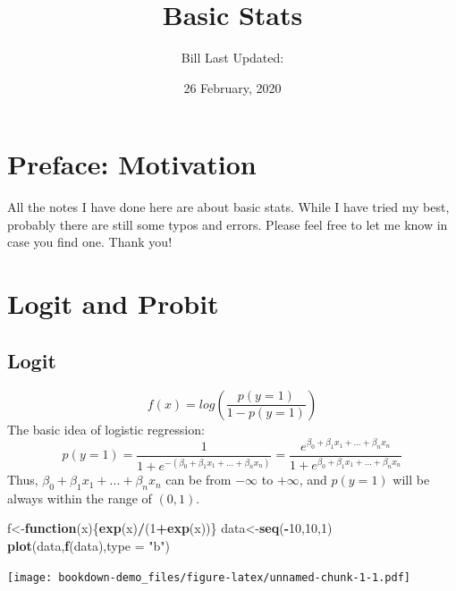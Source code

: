 \documentclass[
]{book}
\title{Basic Stats}
\author{Bill Last Updated:}
\date{26 February, 2020}
\newenvironment{Shaded}{\begin{snugshade}}{\end{snugshade}}
\newcommand{\ControlFlowTok}[1]{\textcolor[rgb]{0.13,0.29,0.53}{\textbf{#1}}}
\newcommand{\DataTypeTok}[1]{\textcolor[rgb]{0.13,0.29,0.53}{#1}}
\newcommand{\DecValTok}[1]{\textcolor[rgb]{0.00,0.00,0.81}{#1}}
\newcommand{\KeywordTok}[1]{\textcolor[rgb]{0.13,0.29,0.53}{\textbf{#1}}}
\newcommand{\NormalTok}[1]{#1}
\newcommand{\OperatorTok}[1]{\textcolor[rgb]{0.81,0.36,0.00}{\textbf{#1}}}
\newcommand{\StringTok}[1]{\textcolor[rgb]{0.31,0.60,0.02}{#1}}
\begin{document}
\frontmatter
\maketitle

{
\setcounter{tocdepth}{1}
\tableofcontents
}
\mainmatter
\hypertarget{my-section}{%
\chapter*{Preface: Motivation}\label{my-section}}

All the notes I have done here are about basic stats. While I have tried my best, probably there are still some typos and errors. Please feel free to let me know in case you find one. Thank you!

\hypertarget{logit-and-probit}{%
\chapter{Logit and Probit}\label{logit-and-probit}}

\hypertarget{logit}{%
\section{Logit}\label{logit}}

\[f(x)=log(\frac{p(y=1)}{1-p(y=1)})\]
The basic idea of logistic regression:
\[p(y=1)=\frac{1}{1+e^{-(\beta_0+\beta_1x_1+...+\beta_nx_n)}}=\frac{e^{\beta_0+\beta_1x_1+...+\beta_nx_n}}{1+e^{\beta_0+\beta_1x_1+...+\beta_nx_n}}\]
Thus, \(\beta_0+\beta_1x_1+...+\beta_nx_n\) can be from \(-\infty\) to \(+\infty\), and \(p(y=1)\) will be always within the range of \((0,1)\).

\begin{Shaded}
\begin{Highlighting}[]
\NormalTok{f<-}\ControlFlowTok{function}\NormalTok{(x)\{}\KeywordTok{exp}\NormalTok{(x)}\OperatorTok{/}\NormalTok{(}\DecValTok{1}\OperatorTok{+}\KeywordTok{exp}\NormalTok{(x))\}}
\NormalTok{data<-}\KeywordTok{seq}\NormalTok{(}\OperatorTok{-}\DecValTok{10}\NormalTok{,}\DecValTok{10}\NormalTok{,}\DecValTok{1}\NormalTok{)}
\KeywordTok{plot}\NormalTok{(data,}\KeywordTok{f}\NormalTok{(data),}\DataTypeTok{type =} \StringTok{"b"}\NormalTok{)}
\end{Highlighting}
\end{Shaded}

\texttt{[image: bookdown-demo\_files/figure-latex/unnamed-chunk-1-1.pdf]}
\end{document}
